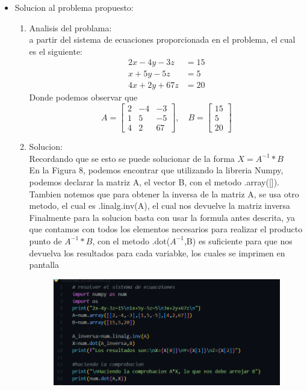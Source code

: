 \documentclass[12pt]{article}
\begin{document}
\begin{itemize}
\item Solucion al problema propuesto:\\
\begin{enumerate}
\item Analisis del problama:\\
a partir del sistema de ecuaciones proporcionada en el problema, el cual es el siguiente:\\

\[
\begin{aligned}
2x - 4y -3z &= 15 \\
x +5y -5z &= 5 \\
4x +2y +67z &= 20
\end{aligned}
\]
Donde podemos observar que
\[
A = \begin{bmatrix}
2 & -4 & -3 \\
1 & 5 & -5 \\
4 & 2 & 67 
\end{bmatrix}, \quad 
B = \begin{bmatrix}
15 \\
5 \\
20 
\end{bmatrix}
\]

\item Solucion:\\
Recordando que se esto se puede solucionar de la forma $X=A^{-1}*B$\\
En la Figura 8, podemos encontrar que utilizando la libreria Numpy, podemos declarar la matriz A, el vector B, con el metodo .array([]). Tambien notemos que para obtener la inversa de la matriz A, se usa otro metodo, el cual es .linalg.inv(A), el cual nos devuelve la matriz inversa\\
Finalmente para la solucion basta con usar la formula antes descrita, ya que contamos con todos los elementos necesarios para realizar el producto punto de $A^{-1}*B$, con el metodo .dot($A^{-1}$,B) es suficiente para que nos devuelva los resultados para cada variabke, los cuales se imprimen en pantalla
\begin{figure}[H]
		\begin{center}
 			\includegraphics[width = .8\textwidth]{sistemae.png}
		\end{center} 
	\end{figure}


\end{enumerate}
\end{itemize}
\end{document}
